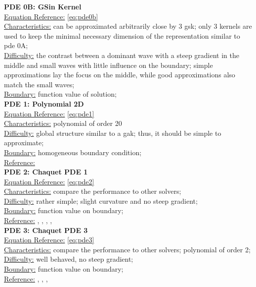 \documentclass[./\jobname.tex]{subfiles}
\begin{document}
\textbf{PDE 0B: GSin Kernel} \\
\underline{Equation Reference:} \eqref{eq:pde0b} \\
\underline{Characteristics:} can be approximated arbitrarily close by 3 \gls{gsk}; only 3 kernels are used to keep the minimal necessary dimension of the representation similar to \gls{pde} 0A;\\
\underline{Difficulty:} the contrast between a dominant wave with a steep gradient in the middle and small waves with little influence on the boundary; simple approximations lay the focus on the middle, while good approximations also match the small waves; \\
\underline{Boundary:} function value of solution; \\

\textbf{PDE 1: Polynomial 2D} \\
\underline{Equation Reference:} \eqref{eq:pde1} \\
\underline{Characteristics:} polynomial of order 20 \\
\underline{Difficulty:} global structure similar to a \gls{gak}; thus, it should be simple to approximate; \\
\underline{Boundary:} homogeneous boundary condition; \\
\underline{Reference:} \cite{mitchell_nist_2018} \\

\textbf{PDE 2: Chaquet PDE 1} \\
\underline{Equation Reference:} \eqref{eq:pde2} \\
\underline{Characteristics:} compare the performance to other solvers; \\
\underline{Difficulty:} rather simple; slight curvature and no steep gradient; \\
\underline{Boundary:} function value on boundary; \\
\underline{Reference:} \cite{chaquet_using_2019}, \cite{chaquet_solving_2012}, \cite{tsoulos_solving_2006}, \cite{sobester_genetic_2008}, \cite{panagant_solving_2014}\\

\textbf{PDE 3: Chaquet PDE 3} \\
\underline{Equation Reference:} \eqref{eq:pde3} \\
\underline{Characteristics:} compare the performance to other solvers; polynomial of order 2; \\
\underline{Difficulty:} well behaved, no steep gradient; \\
\underline{Boundary:} function value on boundary; \\
\underline{Reference:} \cite{chaquet_using_2019}, \cite{chaquet_solving_2012}, \cite{tsoulos_solving_2006}, \cite{panagant_solving_2014} \\
\end{document}
